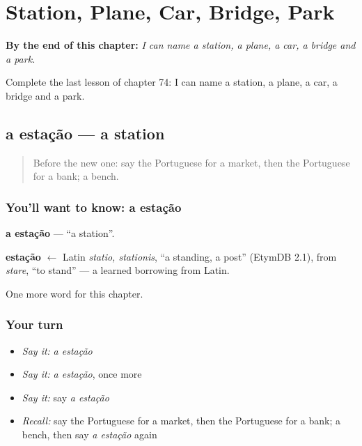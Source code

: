 
\chapter{Station, Plane, Car, Bridge, Park}
\label{ch:pt-station-plane-car-bridge-park}

\begin{chapteropening}
\textbf{By the end of this chapter:} \emph{I can name a station, a plane, a car, a bridge and a park.}

Complete the last lesson of chapter 74: I can name a station, a plane, a car, a bridge and a park.
\end{chapteropening}

\section[a estação]{a estação — a station}

\label{lesson:PT-C74-estacao}



\begin{quote}
Before the new one: say the Portuguese for a market, then the Portuguese for a bank; a bench.
\end{quote}

\subsection*{You'll want to know: a estação}
\textbf{a estação} — \textquotedblleft{}a station\textquotedblright{}.

\begin{cousinweb}
\textbf{estação} $\leftarrow$ Latin \emph{statio, stationis}, \textquotedblleft{}a standing, a post\textquotedblright{} (EtymDB 2.1), from \emph{stare}, \textquotedblleft{}to stand\textquotedblright{} — a learned borrowing from Latin.
\end{cousinweb}

\begin{grammarlens}[title={What you've built}]
One more word for this chapter.
\end{grammarlens}

\subsection*{Your turn}
\begin{itemize}
\raggedright
  \item \emph{Say it:} \emph{a estação}
  \item \emph{Say it:} \emph{a estação}, once more
  \item \emph{Say it:} say \emph{a estação}
  \item \emph{Recall:} say the Portuguese for a market, then the Portuguese for a bank; a bench, then say \emph{a estação} again
\end{itemize}

